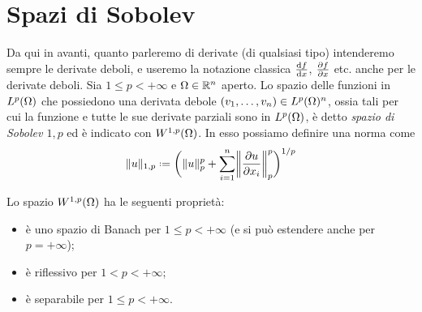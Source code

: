 \section{Spazi di Sobolev}
Da qui in avanti, quanto parleremo di derivate (di qualsiasi tipo) intenderemo sempre le derivate deboli, e useremo la notazione classica $\drv{f}{x}$, $\drp{f}{x}$ etc. anche per le derivate deboli.
Sia $1\le p<+\infty$ e $\Omega\in\R^n$ aperto.
Lo spazio delle funzioni in $\leb[p]{\Omega}$ che possiedono una derivata debole $(v_1,\dotsc,v_n)\in\leb[p]{\Omega}^n$, ossia tali per cui la funzione e tutte le sue derivate parziali sono in $\leb[p]{\Omega}$, è detto \emph{spazio di Sobolev $1,p$} ed è indicato con $\sobW[1,p]{\Omega}$.
In esso possiamo definire una norma come
\begin{equation}
    \norm{u}_{1,p}\defeq\biggl(\norm{u}_p^p+\sum_{i=1}^n\norm[\bigg]{\drp{u}{x_i}}_p^p\biggr)^{1/p}
    \label{eq:norma-W1p}
\end{equation}
\begin{proprieta}
    Lo spazio $\sobW[1,p]{\Omega}$ ha le seguenti proprietà:
    \begin{itemize}
        \item è uno spazio di Banach per $1\le p<+\infty$ (e si può estendere anche per $p=+\infty$);
        \item è riflessivo per $1<p<+\infty$;
        \item è separabile per $1\le p<+\infty$.
    \end{itemize}
\end{proprieta}
